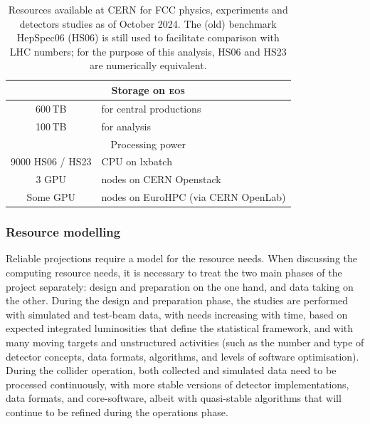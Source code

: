 \begin{table}[t]
\centering
\caption{Resources available at CERN for FCC physics, experiments and detectors studies as of October 2024. 
The (old) benchmark HepSpec06 (HS06) is still used to facilitate comparison with LHC numbers; 
for the purpose of this analysis, HS06 and HS23 are numerically equivalent.}
\label{tab:cernres}
\begin{tabular}{c l}
\toprule
\multicolumn{2}{c}{Storage on \textsc{eos}} \\
\midrule
600\,TB & for central productions \\
100\,TB & for analysis \\ 
\midrule
\multicolumn{2}{c}{Processing power} \\ 
\midrule
9000 HS06 / HS23 & CPU on lxbatch \\
3 GPU & nodes on CERN Openstack \\
Some GPU & nodes on EuroHPC (via CERN OpenLab) \\ 
\bottomrule
\end{tabular}
\end{table}

\subsubsection{Resource modelling} 
\label{sec:resourceshllhc}

Reliable projections require a model for the resource needs. 
When discussing the computing resource needs, it is necessary to treat the two main phases of the project separately: 
design and preparation on the one hand, and data taking on the other.
During the design and preparation phase, the studies are performed with simulated and test-beam data, with needs increasing with time, based on expected integrated luminosities that define the statistical framework, and with many moving targets and unstructured activities (such as the number and type of detector concepts, data formats, algorithms, and levels of software optimisation). During the collider operation, both collected and simulated data need to be processed continuously, with more stable versions of detector implementations, data formats, and core-software, 
albeit with quasi-stable algorithms that will continue to be refined during the operations phase. 

